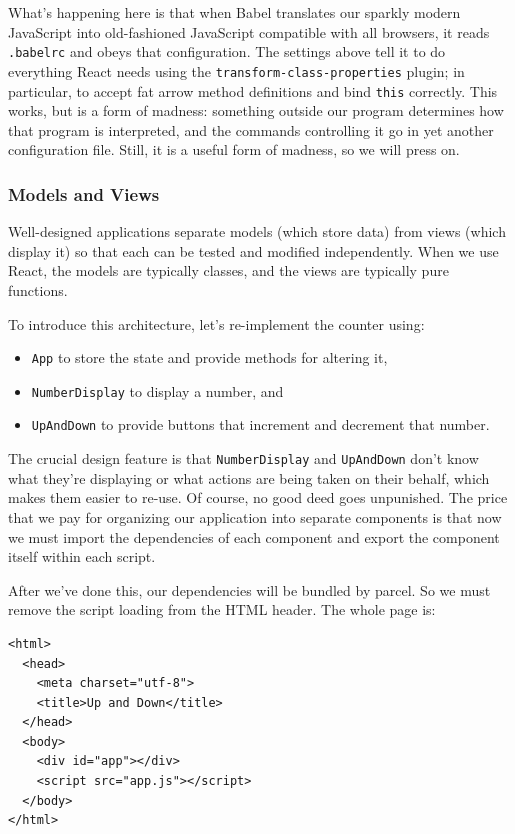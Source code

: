 What's happening here is that when Babel translates our sparkly modern
JavaScript into old-fashioned JavaScript compatible with all browsers,
it reads \texttt{.babelrc} and obeys that configuration. The settings
above tell it to do everything React needs using the
\texttt{transform-class-properties} plugin; in particular, to accept fat
arrow method definitions and bind \texttt{this} correctly. This works,
but is a form of madness: something outside our program determines how
that program is interpreted, and the commands controlling it go in yet
another configuration file. Still, it is a useful form of madness, so we
will press on.

\subsubsection{Models and Views}\label{s:interactive-models-views}

Well-designed applications separate models (which store data) from views
(which display it) so that each can be tested and modified
independently. When we use React, the models are typically classes, and
the views are typically pure functions.

To introduce this architecture, let's re-implement the counter using:

\begin{itemize}
\tightlist
\item
  \texttt{App} to store the state and provide methods for altering it,
\item
  \texttt{NumberDisplay} to display a number, and
\item
  \texttt{UpAndDown} to provide buttons that increment and decrement
  that number.
\end{itemize}

The crucial design feature is that \texttt{NumberDisplay} and
\texttt{UpAndDown} don't know what they're displaying or what actions
are being taken on their behalf, which makes them easier to re-use. Of
course, no good deed goes unpunished. The price that we pay for
organizing our application into separate components is that now we must
import the dependencies of each component and export the component
itself within each script.

After we've done this, our dependencies will be bundled by parcel. So we
must remove the script loading from the HTML header. The whole page is:

\begin{verbatim}
<html>
  <head>
    <meta charset="utf-8">
    <title>Up and Down</title>
  </head>
  <body>
    <div id="app"></div>
    <script src="app.js"></script>
  </body>
</html>
\end{verbatim}

